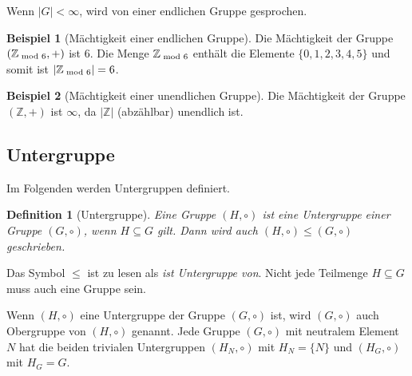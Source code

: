\documentclass[12pt,a4paper, usenames, dvipsnames]{article}
\theoremstyle{mystyle}
\newtheorem{definition}{Definition}
\theoremstyle{definition}
\newtheorem{bsp}{Beispiel}[definition]
\begin{document}
Wenn $|G| < \infty$, wird von einer endlichen Gruppe gesprochen.

\begin{bsp}[Mächtigkeit einer endlichen Gruppe]

Die Mächtigkeit der Gruppe $(\mathbb{Z}_{\hspace*{-0.3em}\mod 6}, +)$ ist $6$. Die Menge $\mathbb{Z}_{\hspace*{-0.3em}\mod 6}$ enthält die Elemente $\{0,1,2,3,4,5 \}$ und somit ist $| \mathbb{Z}_{\hspace*{-0.3em}\mod 6} | = 6$.

\end{bsp}

\begin{bsp}[Mächtigkeit einer unendlichen Gruppe]

Die Mächtigkeit der Gruppe $(\mathbb{Z}, +)$ ist $\infty$, da $|\mathbb{Z}|$ (abzählbar) unendlich ist.

\end{bsp}

%
%
%
%
%
%
%
%
%
%
\subsection{Untergruppe} 
\label{Abschnitt_Untergruppe}

Im Folgenden werden Untergruppen definiert.


\begin{definition}[Untergruppe]
Eine Gruppe $(H, \circ)$ ist eine Untergruppe einer Gruppe $(G, \circ)$, wenn $H \subseteq G$ gilt. Dann wird auch $(H, \circ) \leqslant (G, \circ)$ geschrieben. 
\end{definition}

Das Symbol $\leqslant$ ist zu lesen als \textit{ist Untergruppe von}. Nicht jede Teilmenge $H \subseteq G$ muss auch eine Gruppe sein.

Wenn $(H, \circ)$ eine Untergruppe der Gruppe $(G, \circ)$ ist, wird $(G, \circ)$ auch Obergruppe von $(H, \circ)$ genannt.
Jede Gruppe $(G, \circ)$ mit neutralem Element $N$ hat die beiden trivialen Untergruppen $(H_N, \circ)$ mit ${H_N = \{N\}}$ und $(H_G, \circ)$ mit $H_G=G$.
\end{document}
